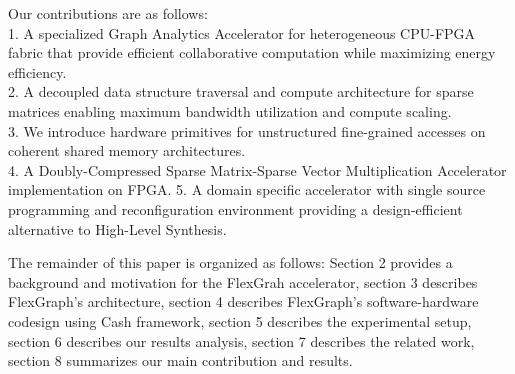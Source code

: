 Our contributions are as follows:\\
1.	A specialized Graph Analytics Accelerator for heterogeneous CPU-FPGA fabric that provide efficient collaborative computation while maximizing energy efficiency.\\
2. 	A decoupled data structure traversal and compute architecture for sparse matrices enabling maximum bandwidth utilization and compute scaling.\\
3.	We introduce hardware primitives for unstructured fine-grained accesses on coherent shared memory architectures.\\
4. 	A Doubly-Compressed Sparse Matrix-Sparse Vector Multiplication Accelerator implementation on FPGA. 
5. 	A domain specific accelerator with single source programming and reconfiguration environment providing a design-efficient alternative to High-Level Synthesis.  

The remainder of this paper is organized as follows:
Section 2 provides a background and motivation for the FlexGrah accelerator, section 3 describes FlexGraph's architecture, section 4 describes FlexGraph's software-hardware codesign using Cash \cite{Cash} framework, section 5 describes the experimental setup, section 6 describes our results analysis, section 7 describes the related work, section 8 summarizes our main contribution and results.